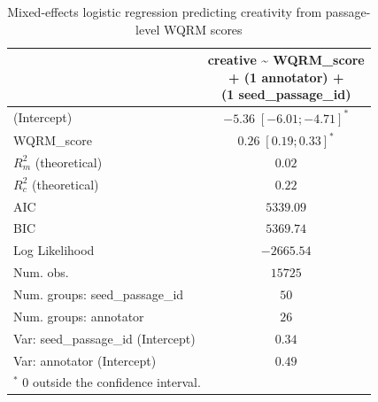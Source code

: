 
\usepackage{booktabs}

\begin{table}[htbp]
\begin{center}
\begin{tabular}{l c}
\toprule
 & \shortstack[l]{creative \textasciitilde{} WQRM\_score  \\ 
+ (1 \textbar{} annotator) + \\ 
(1 \textbar{} seed\_passage\_id)} \\
\midrule
(Intercept)                        & $-5.36 \; [-6.01; -4.71]^{*}$ \\
WQRM\_score                        & $0.26 \; [ 0.19;  0.33]^{*}$  \\
\midrule
$R^2_m$ (theoretical)              & $0.02$                        \\
$R^2_c$ (theoretical)              & $0.22$                        \\
AIC                                & $5339.09$                     \\
BIC                                & $5369.74$                     \\
Log Likelihood                     & $-2665.54$                    \\
Num. obs.                          & $15725$                       \\
Num. groups: seed\_passage\_id     & $50$                          \\
Num. groups: annotator             & $26$                          \\
Var: seed\_passage\_id (Intercept) & $0.34$                        \\
Var: annotator (Intercept)         & $0.49$                        \\
\bottomrule
\multicolumn{2}{l}{\scriptsize{$^*$ 0 outside the confidence interval.}}
\end{tabular}
\caption{Mixed-effects logistic regression predicting creativity from passage-level WQRM scores}
\label{tab:glmer_nov_wqrm}
\end{center}
\end{table}
